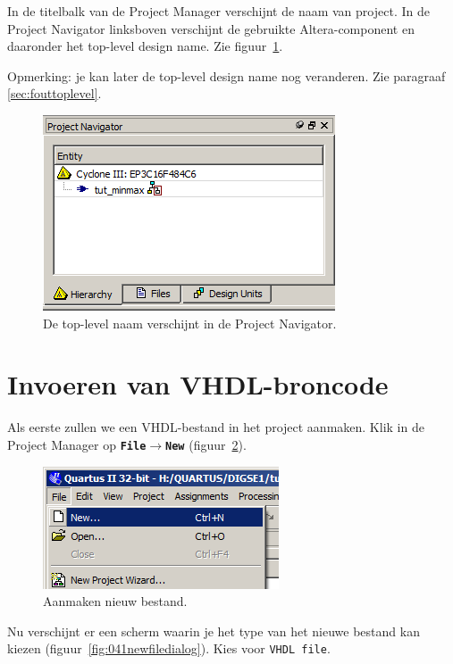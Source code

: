 \documentclass[a4paper,12pt,fleqn,twoside]{book}
\def\tutpicscale{0.455}
\newcommand{\menu}[1]{\texttt{\textbf{#1}}}
\newcommand{\naam}[1]{\texttt{#1}}
\def\pijl{$\rightarrow$}%
\begin{document}
In de titelbalk van de Project Manager verschijnt de naam van project. In de
Project Navigator linksboven verschijnt de gebruikte Altera-component en
daaronder het top-level design name. Zie
figuur~\ref{fig:032projectnavigator_exerpt}.

Opmerking: je kan later de top-level design name nog veranderen. Zie
paragraaf \ref{sec:fouttoplevel}.
 
\begin{figure}[H]
\centering
\includegraphics[scale=\tutpicscale]{032projectnavigator_exerpt.png}
\caption{De top-level naam verschijnt in de Project Navigator.}
\label{fig:032projectnavigator_exerpt}
\end{figure}


\section{Invoeren van VHDL-broncode}
\label{sec:invoerenvhdlbroncode}
Als eerste zullen we een VHDL-bestand in het project aanmaken. Klik in de
Project Manager op \menu{File\pijl{}New} (figuur~\ref{fig:040createnewfile}).
 
\begin{figure}[H]
\centering
\includegraphics[scale=\tutpicscale]{040createnewfile.png}
\caption{Aanmaken nieuw bestand.}
\label{fig:040createnewfile}
\end{figure}

Nu verschijnt er een scherm waarin je het type van het nieuwe bestand kan
kiezen (figuur~\ref{fig:041newfiledialog}). Kies voor \naam{VHDL file}.
 
\end{document}
